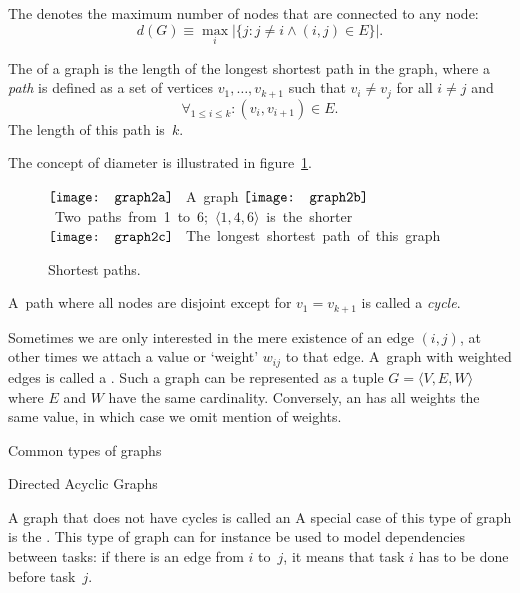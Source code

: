 \begin{definition}
The
 denotes the maximum number of nodes that are
connected to any node:
\[ 
  d(G)\equiv \max_i 
  \left|\{j\colon j\not=i\wedge (i,j)\in E\}\right|.
\]
\end{definition}

\begin{definition}
The  of a graph is the length of the longest
shortest path
in the graph, where a \emph{path}
is defined as a set of vertices
$v_1,\ldots, v_{k+1}$ such that $v_i\not=v_j$ for all $i\not=j$ and
\[ \forall_{1\leq i\leq k}\colon (v_i,v_{i+1})\in E. \]
The length of this path is~$k$.
\end{definition}
The concept of diameter is illustrated
in figure~\ref{fig:graph2}.

\begin{figure}[ht]
  \hbox{$\vcenter{\hbox{%
        \texttt{[image: graph2a]}
    }}$%
    A graph}
  \hbox{$\vcenter{\hbox{%
        \texttt{[image: graph2b]}
    }}$%
    Two paths from 1 to 6; $\langle 1,4,6\rangle$ is the shorter}
  \hbox{$\vcenter{\hbox{%
        \texttt{[image: graph2c]}
    }}$%
    The longest shortest path of this graph}
  \caption{Shortest paths.}
  \label{fig:graph2}
\end{figure}

A~path where all nodes are disjoint
except for $v_1=v_{k+1}$ is called a \emph{cycle}.

Sometimes we are only interested in the mere existence of an edge
$(i,j)$, at other times we attach a value or `weight' $w_{ij}$ to that
edge.
A~graph with weighted edges is called a %
.
Such a graph can be represented as a tuple
$G=\langle V,E,W\rangle$ where $E$ and $W$ have the same cardinality.
Conversely, an %
has all weights the same value, in which case we omit mention of weights.

 {Common types of graphs}

 {Directed Acyclic Graphs}

A graph that does not have cycles is called an
A special case of this type of graph is the .
This type of graph can for instance be
used to model dependencies between tasks:
if there is an edge from $i$ to~$j$,
it means that task $i$ has to be done before task~$j$.

